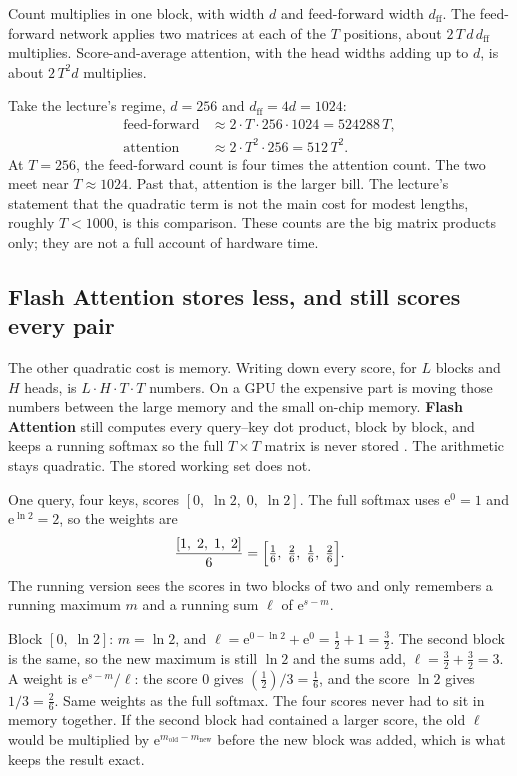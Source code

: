 \documentclass[11pt]{article}
\begin{document}
Count multiplies in one block, with width \(d\) and feed-forward width
\(d_{\mathrm{ff}}\). The feed-forward network applies two matrices at each
of the \(T\) positions, about \(2\,T\,d\,d_{\mathrm{ff}}\) multiplies.
Score-and-average attention, with the head widths adding up to \(d\), is
about \(2\,T^2 d\) multiplies.

Take the lecture's regime, \(d=256\) and \(d_{\mathrm{ff}}=4d=1024\):
\begin{align*}
  \text{feed-forward}
  &\approx 2\cdot T\cdot 256\cdot 1024 = 524288\,T,\\
  \text{attention}
  &\approx 2\cdot T^2\cdot 256 = 512\,T^2.
\end{align*}
At \(T=256\), the feed-forward count is four times the attention count.
The two meet near \(T\approx 1024\). Past that, attention is the larger
bill. The lecture's statement that the quadratic term is not the main cost
for modest lengths, roughly \(T<1000\), is this comparison. These counts
are the big matrix products only; they are not a full account of hardware
time.

\subsection{Flash Attention stores less, and still scores every pair}

The other quadratic cost is memory. Writing down every score, for \(L\)
blocks and \(H\) heads, is \(L\cdot H\cdot T\cdot T\) numbers. On a GPU the
expensive part is moving those numbers between the large memory and the
small on-chip memory. \textbf{Flash Attention} still computes every
query--key dot product, block by block, and keeps a running softmax so the
full \(T\times T\) matrix is never stored \cite{dao2022flashattention}. The
arithmetic stays quadratic. The stored working set does not.

One query, four keys, scores \([0,\;\ln 2,\;0,\;\ln 2]\). The full softmax
uses \(\mathrm{e}^{0}=1\) and \(\mathrm{e}^{\ln 2}=2\), so the weights are
\[
  \frac{[1,\;2,\;1,\;2]}{6}
  =
  \Bigl[\tfrac{1}{6},\;\tfrac{2}{6},\;\tfrac{1}{6},\;\tfrac{2}{6}\Bigr].
\]
The running version sees the scores in two blocks of two and only remembers
a running maximum \(m\) and a running sum \(\ell\) of
\(\mathrm{e}^{s-m}\).

Block \([0,\;\ln 2]\): \(m=\ln 2\), and
\(\ell=\mathrm{e}^{0-\ln 2}+\mathrm{e}^{0}=\tfrac{1}{2}+1=\tfrac{3}{2}\).
The second block is the same, so the new maximum is still \(\ln 2\) and the
sums add, \(\ell=\tfrac{3}{2}+\tfrac{3}{2}=3\). A weight is
\(\mathrm{e}^{s-m}/\ell\): the score \(0\) gives
\((\tfrac{1}{2})/3=\tfrac{1}{6}\), and the score \(\ln 2\) gives
\(1/3=\tfrac{2}{6}\). Same weights as the full softmax. The four scores
never had to sit in memory together. If the second block had contained a
larger score, the old \(\ell\) would be multiplied by
\(\mathrm{e}^{m_{\mathrm{old}}-m_{\mathrm{new}}}\) before the new block was
added, which is what keeps the result exact.
\end{document}
